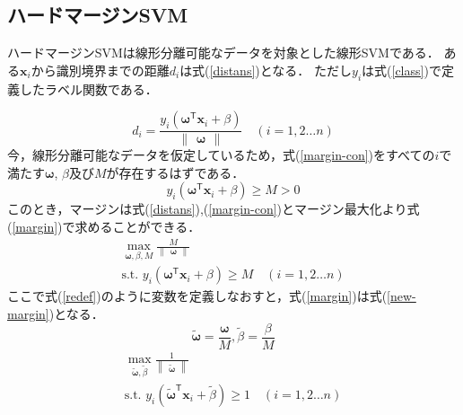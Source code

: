 \documentclass[11pt,a4paper,titlepage]{ltjsarticle}
\begin{document}
\subsection{ハードマージンSVM}
\label{sec:hardmagin}
ハードマージンSVMは線形分離可能なデータを対象とした線形SVMである．
ある$\bm{x}_i$から識別境界までの距離$d_i$は式(\ref{distans})となる．
ただし$y_i$は式(\ref{class})で定義したラベル関数である．

\begin{equation}
    \label{distans}
    d_i = \frac{y_i(\bm{\omega}^\mathsf{T}\bm{x}_i + \beta)}{\begin{Vmatrix}\bm{\omega}\end{Vmatrix}}\quad(i = 1,2\dots n)
\end{equation}
今，線形分離可能なデータを仮定しているため，式(\ref{margin-con})をすべての$i$で満たす$\bm{\omega}$,
$\beta$及び$M$が存在するはずである．
\begin{equation}
    \label{margin-con}
    y_i(\bm{\omega}^\mathsf{T}\bm{x}_i + \beta) \geq M > 0
\end{equation}
このとき，マージンは式(\ref{distans}),(\ref{margin-con})とマージン最大化より式(\ref{margin})で求めることができる．
\begin{equation}
    \label{margin}
    \begin{gathered}
        \max_{\bm{\omega},\beta,M}\frac{M}{\begin{Vmatrix}\bm{\omega}\end{Vmatrix}}\\
        \text{s.t. } y_i(\bm{\omega}^\mathsf{T}\bm{x}_i + \beta) \geq M \quad (i=1,2\dots n)    
    \end{gathered}
\end{equation}
ここで式(\ref{redef})のように変数を定義しなおすと，式(\ref{margin})は式(\ref{new-margin})となる．
\begin{equation}
    \label{redef}
    \bm{\tilde{\omega}} = \frac{\bm{\omega}}{M},\tilde{\beta} = \frac{\beta}{M}
\end{equation}
\begin{equation}
    \label{new-margin}
    \begin{gathered}
        \max_{\bm{\tilde{\omega}},\tilde{\beta}}\frac{1}{\begin{Vmatrix}\bm{\tilde{\omega}}\end{Vmatrix}}\\
        \text{s.t. } y_i(\bm{\tilde{\omega}}^\mathsf{T}\bm{x}_i + \tilde{\beta}) \geq 1 \quad (i=1,2\dots n)
    \end{gathered}
\end{equation}
\end{document}
